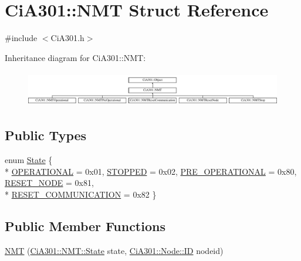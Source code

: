 \hypertarget{struct_ci_a301_1_1_n_m_t}{\section{Ci\-A301\-:\-:N\-M\-T Struct Reference}
\label{struct_ci_a301_1_1_n_m_t}
}


{\ttfamily \#include $<$Ci\-A301.\-h$>$}

Inheritance diagram for Ci\-A301\-:\-:N\-M\-T\-:\begin{figure}[H]
\begin{center}
\leavevmode
\includegraphics[height=1.592417cm]{d6/d0d/struct_ci_a301_1_1_n_m_t}
\end{center}
\end{figure}
\subsection*{Public Types}
\begin{DoxyCompactItemize}
\item 
enum \hyperlink{struct_ci_a301_1_1_n_m_t_a08d5e3b45a55a112518bdcc06ff3617a}{State} \{ \\*
\hyperlink{struct_ci_a301_1_1_n_m_t_a08d5e3b45a55a112518bdcc06ff3617aae69a04e5dffdaafb6ee9f4da1f627d72}{O\-P\-E\-R\-A\-T\-I\-O\-N\-A\-L} = 0x01, 
\hyperlink{struct_ci_a301_1_1_n_m_t_a08d5e3b45a55a112518bdcc06ff3617aa52f47aaf4a4da7973192b524f74991cc}{S\-T\-O\-P\-P\-E\-D} = 0x02, 
\hyperlink{struct_ci_a301_1_1_n_m_t_a08d5e3b45a55a112518bdcc06ff3617aa185786922de9fd780160d1ae8dcbffe5}{P\-R\-E\-\_\-\-O\-P\-E\-R\-A\-T\-I\-O\-N\-A\-L} = 0x80, 
\hyperlink{struct_ci_a301_1_1_n_m_t_a08d5e3b45a55a112518bdcc06ff3617aaf270c0a154edf557ca5e86e42aa790b7}{R\-E\-S\-E\-T\-\_\-\-N\-O\-D\-E} = 0x81, 
\\*
\hyperlink{struct_ci_a301_1_1_n_m_t_a08d5e3b45a55a112518bdcc06ff3617aa2b5417931cbee7051e24a74ce32b0133}{R\-E\-S\-E\-T\-\_\-\-C\-O\-M\-M\-U\-N\-I\-C\-A\-T\-I\-O\-N} = 0x82
 \}
\end{DoxyCompactItemize}
\subsection*{Public Member Functions}
\begin{DoxyCompactItemize}
\item 
\hyperlink{struct_ci_a301_1_1_n_m_t_ad1ba4e6e7e11c37da30fd37fd10f6ad8}{N\-M\-T} (\hyperlink{struct_ci_a301_1_1_n_m_t_a08d5e3b45a55a112518bdcc06ff3617a}{Ci\-A301\-::\-N\-M\-T\-::\-State} state, \hyperlink{namespace_ci_a301_1_1_node_a9c2ced538fec9de6165937ed18e8617b}{Ci\-A301\-::\-Node\-::\-I\-D} nodeid)
\end{DoxyCompactItemize}
